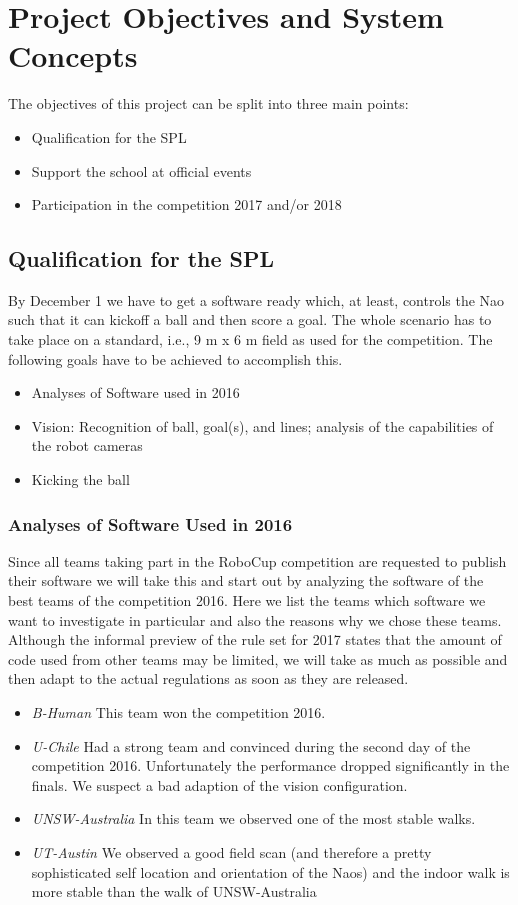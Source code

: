\documentclass[12pt]{article}
\theoremstyle{definition}
\begin{document}
\section{Project Objectives and System Concepts}
The objectives of this project can be split into three main points:
\begin{itemize}
	\item Qualification for the SPL
	\item Support the school at official events 
	\item Participation in the competition 2017 and/or 2018
\end{itemize}


\subsection{Qualification for the SPL}
By December 1 we have to get a software ready which, at least, controls the Nao such that it can kickoff a ball and then score a goal. The whole scenario has to take place on a standard, i.e., 9 m x 6 m field as used for the competition. The following goals have to be achieved to accomplish this.
\begin{itemize}
	\item Analyses of Software used in 2016
	\item Vision: Recognition of ball, goal(s), and lines; analysis of the capabilities of the robot cameras
	\item Kicking the ball
\end{itemize}

\subsubsection{Analyses of Software Used in 2016}
Since all teams taking part in the RoboCup competition are requested to publish their software we will take this and start out by analyzing the software of the best teams of the competition 2016. Here we list the teams which software we want to investigate in particular and also the reasons why we chose these teams. Although the informal preview of the rule set for 2017 states that the amount of code used from other teams may be limited, we will take as much as possible and then adapt to the actual regulations as soon as they are released.

\begin{itemize}
	\item {\em B-Human} This team won the competition 2016.
	\item {\em U-Chile} Had a strong team and convinced during the second day of the competition 2016. Unfortunately the performance dropped significantly in the finals. We suspect a bad adaption of the vision configuration.
	\item {\em UNSW-Australia} In this team we observed one of the most stable walks.
	\item {\em UT-Austin} We observed a  good field scan (and therefore a pretty sophisticated self location and orientation of the Naos) and the indoor walk is more stable than the walk of UNSW-Australia
\end{itemize}
\end{document}
